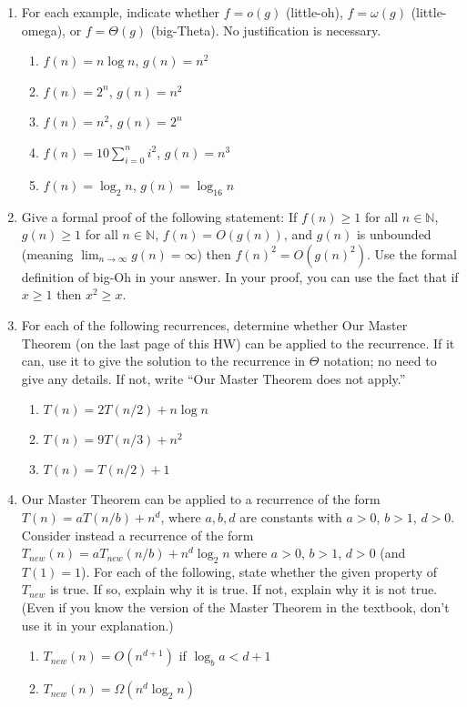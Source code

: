 \documentclass{article}
\begin{document}
\begin{enumerate}
    \item For each example, indicate whether $f = o(g)$ (little-oh), $f = \omega(g)$ (little-omega), or $f = \Theta(g)$ (big-Theta). No justification is necessary.
    \begin{enumerate}
        \item $f(n) = n \log n$, $g(n) = n^2$
        \item $f(n) = 2^n$, $g(n) = n^2$
        \item $f(n) = n^2$, $g(n) = 2^n$
        \item $f(n) = 10 \sum_{i=0}^n i^2$, $g(n) = n^3$
        \item $f(n) = \log_2 n$, $g(n) = \log_{16} n$
    \end{enumerate}

    \item Give a formal proof of the following statement: If $f(n) \ge 1$ for all $n \in \mathbb{N}$, $g(n) \ge 1$ for all $n \in \mathbb{N}$, $f(n) = O(g(n))$, and $g(n)$ is unbounded (meaning $\lim_{n \to \infty} g(n) = \infty$) then $f(n)^2 = O(g(n)^2)$.
    Use the formal definition of big-Oh in your answer.  In your proof, you can use the fact that if $x \ge 1$ then $x^2 \ge x$.


    \item For each of the following recurrences, determine whether Our Master Theorem (on the last page of this HW) can be applied to the recurrence. If it can, use it to give the solution to the recurrence in $\Theta$ notation; no need to give any details. If not, write “Our Master Theorem does not apply.”
    \begin{enumerate}
        \item $T(n) = 2T(n/2) + n \log n$
        \item $T(n) = 9T(n/3) + n^2$
        \item $T(n) = T(n/2) + 1$
    \end{enumerate}

    \item Our Master Theorem can be applied to a recurrence of the form $T(n) = aT(n/b) + n^d$, where $a, b, d$ are constants with $a > 0$, $b > 1$, $d > 0$. Consider instead a recurrence of the form $T_{new}(n) = aT_{new}(n/b) + n^d \log_2 n$ where $a > 0$, $b > 1$, $d > 0$ (and $T(1) = 1$).
    For each of the following, state whether the given property of $T_{new}$ is true. If so, explain why it is true. If not, explain why it is not true. (Even if you know the version of the Master Theorem in the textbook, don’t use it in your explanation.)
    \begin{enumerate}
        \item $T_{new}(n) = O(n^{d+1})$ if $\log_b a < d+1$
        \item $T_{new}(n) = \Omega(n^d \log_2 n)$
    \end{enumerate}


\end{enumerate}
\end{document}
